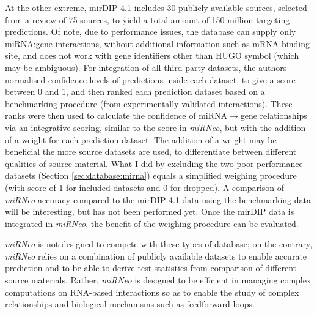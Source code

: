At the other extreme, mirDIP 4.1 includes 30 publicly available sources, selected from a review of 75 sources, to yield a total amount of 150 million targeting predictions.\cite{Tokar2018} Of note, due to performance issues, the database can supply only miRNA:gene interactions, without additional information such as mRNA binding site, and does not work with gene identifiers other than HUGO symbol (which may be ambiguous). For integration of all third-party datasets, the authors normalised confidence levels of predictions inside each dataset, to give a score between 0 and 1, and then ranked each prediction dataset based on a benchmarking procedure (from experimentally validated interactions). These ranks were then used to calculate the confidence of miRNA$\to$gene relationships via an integrative scoring, similar to the score in \emph{miRNeo}, but with the addition of a weight for each prediction dataset. The addition of a weight may be beneficial the more source datasets are used, to differentiate between different qualities of source material. What I did by excluding the two poor performance datasets (Section \ref{sec:database:mirna}) equals a simplified weighing procedure (with score of 1 for included datasets and 0 for dropped). A comparison of \emph{miRNeo} accuracy compared to the mirDIP 4.1 data using the benchmarking data will be interesting, but has not been performed yet. Once the mirDIP data is integrated in \emph{miRNeo}, the benefit of the weighing procedure can be evaluated.

\emph{miRNeo} is not designed to compete with these types of database; on the contrary, \emph{miRNeo} relies on a combination of publicly available datasets to enable accurate prediction\cite{Witkos2011} and to be able to derive test statistics from comparison of different source materials. Rather, \emph{miRNeo} is designed to be efficient in managing complex computations on RNA-based interactions so as to enable the study of complex relationships and biological mechanisms such as feedforward loops.

